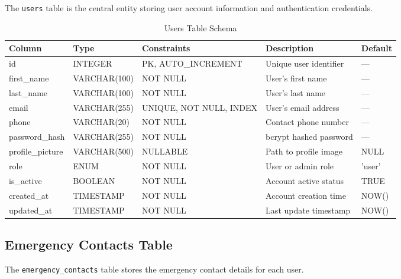 The \texttt{users} table is the central entity storing user account information and authentication credentials.

\begin{table}[H]
  \centering
  \caption{Users Table Schema}
  \label{tab:schema-users}
  \begin{tabularx}{\textwidth}{@{}l l l X l@{}}
    \toprule
    \textbf{Column} & \textbf{Type} & \textbf{Constraints} & \textbf{Description} & \textbf{Default} \\
    \midrule
    id & INTEGER & PK, AUTO\_INCREMENT & Unique user identifier & --- \\
    first\_name & VARCHAR(100) & NOT NULL & User's first name & --- \\
    last\_name & VARCHAR(100) & NOT NULL & User's last name & --- \\
    email & VARCHAR(255) & UNIQUE, NOT NULL, INDEX & User's email address & --- \\
    phone & VARCHAR(20) & NOT NULL & Contact phone number & --- \\
    password\_hash & VARCHAR(255) & NOT NULL & bcrypt hashed password & --- \\
    profile\_picture & VARCHAR(500) & NULLABLE & Path to profile image & NULL \\
    role & ENUM & NOT NULL & User or admin role & 'user' \\
    is\_active & BOOLEAN & NOT NULL & Account active status & TRUE \\
    created\_at & TIMESTAMP & NOT NULL & Account creation time & NOW() \\
    updated\_at & TIMESTAMP & NOT NULL & Last update timestamp & NOW() \\
    \bottomrule
  \end{tabularx}
\end{table}

\subsection{Emergency Contacts Table}

The \texttt{emergency\_contacts} table stores the emergency contact details for each user.

